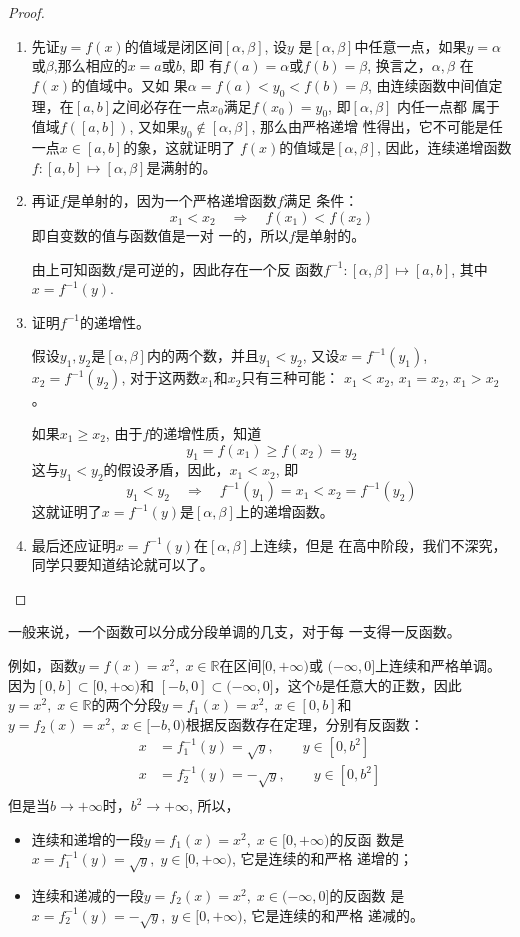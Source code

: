 \begin{proof}
\begin{enumerate}
\item 先证$y=f(x)$的值域是闭区间$[\alpha,\beta]$, 设$y$
是$[\alpha,\beta]$中任意一点，如果$y=\alpha$或$\beta$,那么相应的$x=a$或$b$, 即
有$f(a)=\alpha$或$f(b)=\beta$, 换言之，$\alpha ,\beta$  在$f(x)$的值域中。又如
果$\alpha=f(a)<y_0<f(b)=\beta  $, 由连续函数中间值定理，在$[a,
b]$之间必存在一点$x_0$满足$f(x_0)=y_0$, 即$[\alpha ,\beta]$  内任一点都
属于值域$f([a,b])$, 又如果$y_0\notin [\alpha ,\beta]$, 那么由严格递增
性得出，它不可能是任一点$x\in [a,b]$的象，这就证明了
$f(x)$的值域是$[\alpha,\beta]$, 因此，连续递增函数$f:[a,b]\mapsto [\alpha ,\beta]$是满射的。

\item 再证$f$是单射的，因为一个严格递增函数$f$满足
条件：$$x_1<x_2\quad \Rightarrow\quad f(x_1)<f(x_2)$$ 即自变数的值与函数值是一对
一的，所以$f$是单射的。

由上可知函数$f$是可逆的，因此存在一个反
函数$f^{-1}:[\alpha,\beta]\mapsto [a,b]$, 其中$x=f^{-1}(y)$.
\item 证明$f^{-1}$的递增性。

假设$y_1,y_2$是$[\alpha,\beta]$内的两个数，并且$y_1<y_2$, 又设$x=f^{-1}(y_1)$, $x_2=f^{-1}(y_2)$, 对于这两数$x_1$和$x_2$只有三种可能：
$x_1<x_2$, $x_1=x_2$, $x_1>x_2$。

如果$x_1\ge x_2$, 由于$f$的递增性质，知道
\[y_1=f(x_1)\ge f(x_2)=y_2\]
这与$y_1<y_2$的假设矛盾，因此，$x_1<x_2$, 即
\[y_1<y_2 \quad \Rightarrow\quad f^{-1}(y_1)=x_1<x_2=f^{-1}(y_2)\]
这就证明了$x=f^{-1}(y)$是$[\alpha,\beta]$上的递增函数。
\item 最后还应证明$x=f^{-1}(y)$在$[\alpha,\beta]$上连续，但是
在高中阶段，我们不深究，同学只要知道结论就可以了。
\end{enumerate}    
\end{proof} 


一般来说，一个函数可以分成分段单调的几支，对于每
一支得一反函数。

例如，函数$y=f(x)=x^2,\; x\in\mathbb{R}$在区间$[0,+\infty)$或
$(-\infty,0]$上连续和严格单调。因为$[0,b]\subset [0,+\infty)$和
$[-b,0]\subset (-\infty,0]$，这个$b$是任意大的正数，因此$y=x^2,\; x\in\mathbb{R}$的两个分段$y=f_1(x)=x^2,\; x\in [0,b]$和$y=f_2(x)=x^2,\; x\in[-b,0)$根据反函数存在定理，分别有反函数：
\[\begin{split}
    x&=f^{-1}_1(y)=\sqrt{y},\qquad y\in [0,b^2]\\    
    x&=f^{-1}_2(y)=-\sqrt{y},\qquad y\in [0,b^2]\\
\end{split}\]
但是当$b\to+\infty$时，$b^2\to+\infty$, 所以，
\begin{itemize}
    \item 连续和递增的一段$y=f_1(x)=x^2,\; x\in[0,+\infty)$的反函
数是$x=f_1^{-1}(y)=\sqrt{y},\; y\in [0,+\infty)$, 它是连续的和严格
递增的；
\item 连续和递减的一段$y=f_2(x)=x^2,\; x\in(-\infty,0]$的反函数
是$x=f_2^{-1}(y)=-\sqrt{y},\; y\in[0,+\infty)$, 它是连续的和严格
递减的。
\end{itemize}

